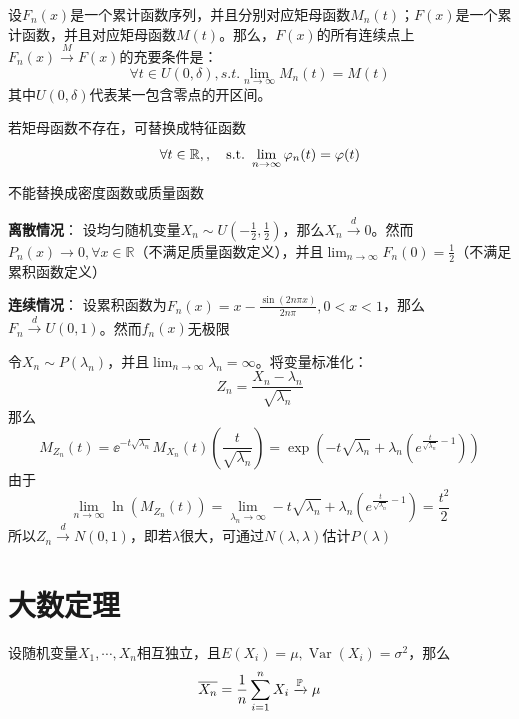 \begin{theorem}[连续性定理]\label{thm:continuity}
    设$F_n(x)$是一个累计函数序列，并且分别对应矩母函数$M_n(t)$；$F(x)$是一个累计函数，并且对应矩母函数$M(t)$。那么，$F(x)$的所有连续点上$F_n(x) \xrightarrow{M} F(x)$的充要条件是：
    \[ \forall t \in U(0,\delta) ,s.t. \lim_{n \to \infty}M_n(t) = M(t)\]
    其中$U(0,\delta)$代表某一包含零点的开区间。
    
    若矩母函数不存在，可替换成特征函数
    \[ \forall t \in \mathbb{R} ,\st \lim_{n \to \infty}\varphi_n(t) = \varphi(t)\]
\end{theorem}
\begin{remark}
    不能替换成密度函数或质量函数
\end{remark}

\begin{example}
    \textbf{离散情况}：
    设均匀随机变量$X_n \sim U(-\frac{1}{2},\frac{1}{2})$，那么$X_n \xrightarrow{d} 0$。然而$P_n(x) \to 0, \forall x \in \mathbb{R}$（不满足质量函数定义），并且$\lim_{n \to \infty}F_n(0)=\frac{1}{2}$（不满足累积函数定义）

    \textbf{连续情况}：
    设累积函数为$F_n(x)=x-\frac{\sin(2n\pi x)}{2n\pi}, 0<x<1$，那么$F_n \xrightarrow{d} U(0,1)$。然而$f_n(x)$无极限
\end{example}

\begin{example}[泊松分布收敛于正态分布]
    令$X_n \sim P(\lambda_n)$，并且$\lim_{n \to \infty}\lambda_n =\infty$。将变量标准化：
    \[ Z_n=\frac{X_n-\lambda_n}{\sqrt{\lambda_n}} \]
    那么
    \[M_{Z_n}(t)=\ee^{-t\sqrt{\lambda_n}}M_{X_n}(t)(\frac{t}{\sqrt{\lambda_n}})=\exp(-t\sqrt{\lambda_n}+\lambda_n(e^{\frac{t}{\sqrt{\lambda_n}}-1}))\]
    由于
    \[ \lim_{n \to \infty}\ln(M_{Z_n}(t))=\lim_{\lambda_n \to \infty}-t\sqrt{\lambda_n}+\lambda_n(e^{\frac{t}{\sqrt{\lambda_n}}-1})=\frac{t^2}{2} \]
    所以$Z_n \xrightarrow{d} N(0,1)$，即若$\lambda$很大，可通过$N(\lambda,\lambda)$估计$P(\lambda)$
\end{example}

\section{大数定理}\label{sec:large_number}

\begin{theorem}[弱大数定理]
    设随机变量$X_1,\cdots ,X_n$相互独立，且$E(X_i)=\mu,\operatorname{Var}(X_i)=\sigma^2$，那么
    \[ \overline{X_n}=\frac{1}{n}\sum_{i=1}^n X_i \xrightarrow{\P} \mu \]
\end{theorem}

